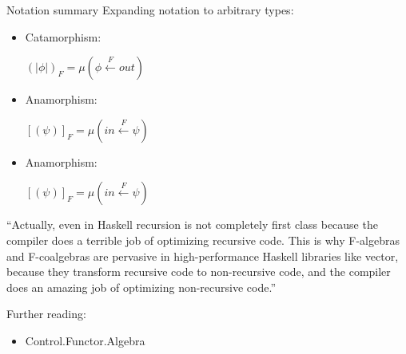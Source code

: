 \documentclass{beamer}
\begin{document}
\begin{frame}{Notation summary}
Expanding notation to arbitrary types:
\begin{itemize}
\item Catamorphism:

$(\!|\phi|\!)_F = \mu(\phi \xleftarrow{F} out)$ 

\item Anamorphism:

$[\!(\psi)\!]_F = \mu(in \xleftarrow{F} \psi )$ 

\item Anamorphism:

$[\!(\psi)\!]_F = \mu(in \xleftarrow{F} \psi )$ 


\end{itemize}

\end{frame}




\begin{frame}
``Actually, even in Haskell recursion is not completely first class because the compiler does a terrible job of optimizing recursive code. This is why F-algebras and F-coalgebras are pervasive in high-performance Haskell libraries like vector, because they transform recursive code to non-recursive code, and the compiler does an amazing job of optimizing non-recursive code.''

\end{frame}
\begin{frame}
Further reading:
\begin{itemize}
\item Control.Functor.Algebra
\end{itemize}
\end{frame}
\end{document}
